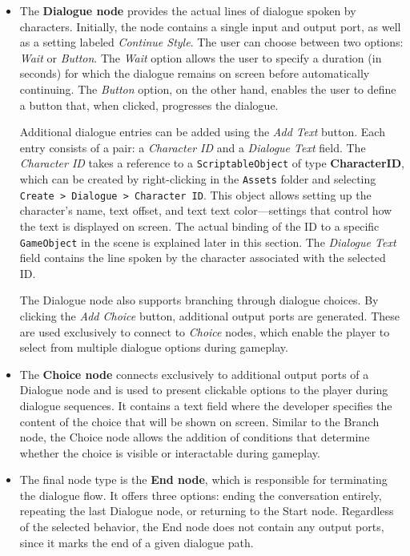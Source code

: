 \begin{itemize}
    \item The \textbf{Dialogue node} provides the actual lines of dialogue spoken by characters. Initially, the node contains a single input and output port, as well as a setting labeled \textit{Continue Style}. The user can choose between two options: \textit{Wait} or \textit{Button}. The \textit{Wait} option allows the user to specify a duration (in seconds) for which the dialogue remains on screen before automatically continuing. The \textit{Button} option, on the other hand, enables the user to define a button that, when clicked, progresses the dialogue.

Additional dialogue entries can be added using the \textit{Add Text} button. Each entry consists of a pair: a \textit{Character ID} and a \textit{Dialogue Text} field. The \textit{Character ID} takes a reference to a \verb|ScriptableObject| of type \textbf{CharacterID}, which can be created by right-clicking in the \verb|Assets| folder and selecting \verb|Create > Dialogue > Character ID|. This object allows setting up the character's name, text offset, and text text color—settings that control how the text is displayed on screen. The actual binding of the ID to a specific \verb|GameObject| in the scene is explained later in this section. The \textit{Dialogue Text} field contains the line spoken by the character associated with the selected ID.

The Dialogue node also supports branching through dialogue choices. By clicking the \textit{Add Choice} button, additional output ports are generated. These are used exclusively to connect to \textit{Choice} nodes, which enable the player to select from multiple dialogue options during gameplay.

    \item The \textbf{Choice node} connects exclusively to additional output ports of a Dialogue node and is used to present clickable options to the player during dialogue sequences. It contains a text field where the developer specifies the content of the choice that will be shown on screen. Similar to the Branch node, the Choice node allows the addition of conditions that determine whether the choice is visible or interactable during gameplay. 
    \item  The final node type is the \textbf{End node}, which is responsible for terminating the dialogue flow. It offers three options: ending the conversation entirely, repeating the last Dialogue node, or returning to the Start node. Regardless of the selected behavior, the End node does not contain any output ports, since it marks the end of a given dialogue path. 
\end{itemize}
